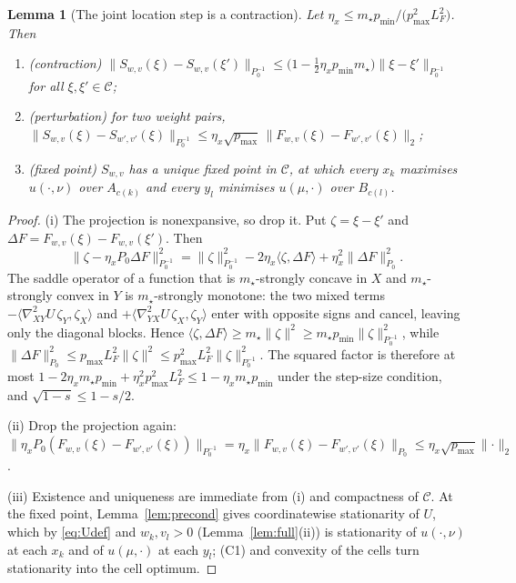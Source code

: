 \documentclass[11pt,a4paper]{article}
\theoremstyle{plain}
\newtheorem{lemma}[theorem]{Lemma}
\theoremstyle{definition}
\theoremstyle{remark}
\newcommand{\ip}[2]{\langle #1, #2\rangle}
\newcommand{\norm}[1]{\lVert #1 \rVert}
\begin{document}
\begin{lemma}[The joint location step is a contraction]\label{lem:track}
Let $\eta_x\le m_\star p_{\min}/\big(p_{\max}^2L_F^2\big)$. Then
\begin{enumerate}[label=(\roman*),leftmargin=*]
\item \emph{(contraction)} $\norm{S_{w,v}(\xi)-S_{w,v}(\xi')}_{P_0^{-1}}
\le\big(1-\tfrac12\eta_x p_{\min}m_\star\big)\norm{\xi-\xi'}_{P_0^{-1}}$ for all
$\xi,\xi'\in\mathcal C$;
\item \emph{(perturbation)} for two weight pairs,
$\norm{S_{w,v}(\xi)-S_{w',v'}(\xi)}_{P_0^{-1}}\le\eta_x\sqrt{p_{\max}}\,
\norm{F_{w,v}(\xi)-F_{w',v'}(\xi)}_2$;
\item \emph{(fixed point)} $S_{w,v}$ has a unique fixed point in $\mathcal C$, at which
every $x_k$ maximises $u(\cdot,\nu)$ over $A_{c(k)}$ and every $y_l$ minimises
$u(\mu,\cdot)$ over $B_{c(l)}$.
\end{enumerate}
\end{lemma}
\begin{proof}
(i) The projection is nonexpansive, so drop it. Put $\zeta=\xi-\xi'$ and
$\Delta F=F_{w,v}(\xi)-F_{w,v}(\xi')$. Then
\[
\norm{\zeta-\eta_xP_0\Delta F}^2_{P_0^{-1}}
=\norm{\zeta}^2_{P_0^{-1}}-2\eta_x\ip{\zeta}{\Delta F}+\eta_x^2\norm{\Delta F}^2_{P_0}.
\]
The saddle operator of a function that is $m_\star$-strongly concave in $X$ and
$m_\star$-strongly convex in $Y$ is $m_\star$-strongly monotone: the two mixed terms
$-\ip{\nabla^2_{XY}U\,\zeta_Y}{\zeta_X}$ and $+\ip{\nabla^2_{YX}U\,\zeta_X}{\zeta_Y}$
enter with opposite signs and cancel, leaving only the diagonal blocks. Hence
$\ip{\zeta}{\Delta F}\ge m_\star\norm{\zeta}^2\ge m_\star p_{\min}\norm{\zeta}^2_{P_0^{-1}}$,
while $\norm{\Delta F}^2_{P_0}\le p_{\max}L_F^2\norm{\zeta}^2\le p_{\max}^2L_F^2\norm{\zeta}^2_{P_0^{-1}}$.
The squared factor is therefore at most
$1-2\eta_xm_\star p_{\min}+\eta_x^2p_{\max}^2L_F^2\le1-\eta_xm_\star p_{\min}$ under the
step-size condition, and $\sqrt{1-s}\le1-s/2$.

(ii) Drop the projection again:
$\norm{\eta_xP_0(F_{w,v}(\xi)-F_{w',v'}(\xi))}_{P_0^{-1}}
=\eta_x\norm{F_{w,v}(\xi)-F_{w',v'}(\xi)}_{P_0}\le\eta_x\sqrt{p_{\max}}\norm{\cdot}_2$.

(iii) Existence and uniqueness are immediate from (i) and compactness of $\mathcal C$.
At the fixed point, Lemma~\ref{lem:precond} gives coordinatewise stationarity of $U$,
which by \eqref{eq:Udef} and $w_k,v_l>0$ (Lemma~\ref{lem:full}(ii)) is stationarity of
$u(\cdot,\nu)$ at each $x_k$ and of $u(\mu,\cdot)$ at each $y_l$; (C1) and convexity of
the cells turn stationarity into the cell optimum.
\end{proof}
\end{document}
